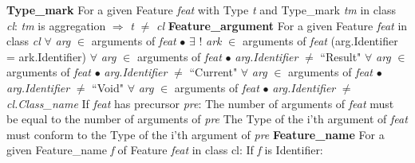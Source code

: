 \indent \indent \textbf{Type\_mark}\newline
\indent \indent \indent For a given Feature \textit{feat} with Type \textit{t} and Type\_mark \textit{tm} in class \textit{cl}:\newline
\indent \indent \indent \indent \textit{tm} is aggregation $\Rightarrow$ \textit{t} $\neq$ \textit{cl}\newline
\indent \indent \textbf{Feature\_argument}\newline
\indent \indent \indent For a given Feature \textit{feat} in class \textit{cl}\newline
\indent \indent \indent \indent $\forall$ \textit{arg} $\in$ arguments of \textit{feat} $\bullet$ $\exists$ ! \textit{ark} $\in$ arguments of \textit{feat} (arg.Identifier = ark.Identifier)\newline
\indent \indent \indent \indent $\forall$ \textit{arg} $\in$ arguments of \textit{feat} $\bullet$ \textit{arg.Identifier} $\neq$ ``Result"\newline
\indent \indent \indent \indent $\forall$ \textit{arg} $\in$ arguments of \textit{feat} $\bullet$ \textit{arg.Identifier} $\neq$ ``Current"\newline
\indent \indent \indent \indent $\forall$ \textit{arg} $\in$ arguments of \textit{feat} $\bullet$ \textit{arg.Identifier} $\neq$ ``Void"\newline
\indent \indent \indent \indent $\forall$ \textit{arg} $\in$ arguments of \textit{feat} $\bullet$ \textit{arg.Identifier} $\neq$ \textit{cl.Class\_name}\newline
\indent \indent \indent If \textit{feat} has precursor \textit{pre}:\newline
\indent \indent \indent \indent The number of arguments of \textit{feat} must be equal to the number of arguments \newline 
\indent \indent \indent \indent of \textit{pre}\newline
\indent \indent \indent \indent The Type of the i'th argument of \textit{feat} must conform to the Type of the i'th argument \newline 
\indent \indent \indent \indent of \textit{pre}\newline
\indent \indent \textbf{Feature\_name}\newline
\indent \indent \indent For a given Feature\_name \textit{f} of Feature \textit{feat} in class {cl}:\newline
\indent \indent \indent \indent If \textit{f} is Identifier:\newline
